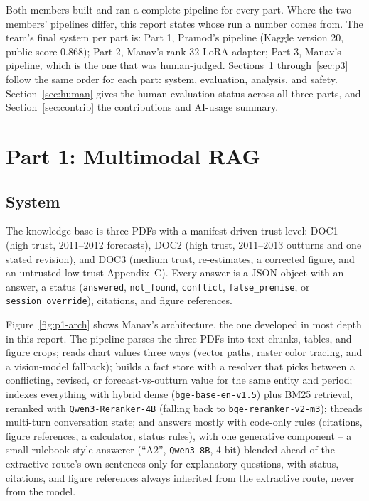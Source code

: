 \documentclass[conference,10pt]{IEEEtran}
\begin{document}
Both members built and ran a complete pipeline for every part. Where the two members' pipelines
differ, this report states whose run a number comes from. The team's final system per part is:
Part 1, Pramod's pipeline (Kaggle version 20, public score 0.868); Part 2, Manav's rank-32 LoRA
adapter; Part 3, Manav's pipeline, which is the one that was human-judged. Sections~\ref{sec:p1}
through~\ref{sec:p3} follow the same order for each part: system, evaluation, analysis, and safety.
Section~\ref{sec:human} gives the human-evaluation status across all three parts, and
Section~\ref{sec:contrib} the contributions and AI-usage summary.

\section{Part 1: Multimodal RAG}
\label{sec:p1}

\subsection{System}

The knowledge base is three PDFs with a manifest-driven trust level: DOC1 (high trust, 2011--2012
forecasts), DOC2 (high trust, 2011--2013 outturns and one stated revision), and DOC3 (medium trust,
re-estimates, a corrected figure, and an untrusted low-trust Appendix~C). Every answer is a JSON
object with an answer, a status (\texttt{answered}, \texttt{not\_found}, \texttt{conflict},
\texttt{false\_premise}, or \texttt{session\_override}), citations, and figure references.

Figure~\ref{fig:p1-arch} shows Manav's architecture, the one developed in most depth in this
report. The pipeline parses the three PDFs into text chunks, tables, and figure crops; reads chart
values three ways (vector paths, raster color tracing, and a vision-model fallback); builds a fact
store with a resolver that picks between a conflicting, revised, or forecast-vs-outturn value for
the same entity and period; indexes everything with hybrid dense (\texttt{bge-base-en-v1.5}) plus
BM25 retrieval, reranked with \texttt{Qwen3-Reranker-4B} (falling back to
\texttt{bge-reranker-v2-m3}); threads multi-turn conversation state; and answers mostly with
code-only rules (citations, figure references, a calculator, status rules), with one generative
component -- a small rulebook-style answerer (``A2'', \texttt{Qwen3-8B}, 4-bit) blended ahead of the
extractive route's own sentences only for explanatory questions, with status, citations, and figure
references always inherited from the extractive route, never from the model.
\end{document}
